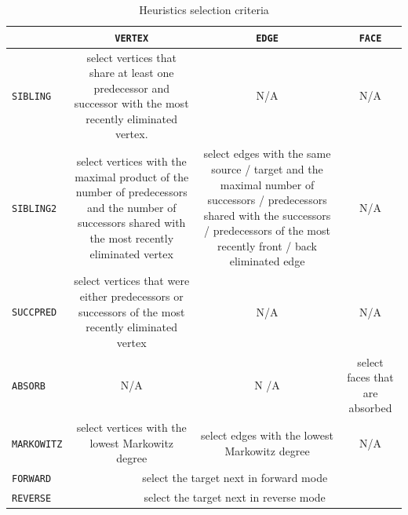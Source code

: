 \documentclass{book}
\begin{document}
\begin{table}[htb]
  \begin{tabular}{|l|c|c|c|}\hline
    & {\tt VERTEX} & {\tt EDGE} & {\tt FACE} 
    \\\hline %
    {\tt SIBLING} 
    &
    \begin{minipage}{.4\linewidth}
      \footnotesize
      select vertices that share at least one predecessor
      and successor with the most recently eliminated vertex.
    \end{minipage}
    & N/A & N/A
    \\\hline %
    {\tt SIBLING2} 
    &
    \begin{minipage}{.4\linewidth}
      \footnotesize
      select vertices with the maximal product of 
      the number of predecessors and the number of 
      successors shared with the most recently eliminated vertex
    \end{minipage}
    &
    \begin{minipage}{.2\linewidth}
      \footnotesize
      select edges with the same source / target and the 
      maximal number of successors / predecessors shared with the 
      successors / predecessors of 
      the most recently front / back eliminated edge
    \end{minipage}
    & N/A 
    \\\hline  %
    {\tt SUCCPRED} 
    &
    \begin{minipage}{.4\linewidth}
      \footnotesize
      select vertices  that were either predecessors or successors of
      the most recently eliminated vertex
    \end{minipage}
    & N/A & N/A 
    \\\hline %
    {\tt ABSORB} 
    & N/A & N /A &
    \begin{minipage}{.2\linewidth}
      select faces that are absorbed
    \end{minipage}
    \\\hline %
    {\tt MARKOWITZ} 
    &
    \begin{minipage}{.4\linewidth}
      \footnotesize
      select vertices with  the lowest Markowitz degree
    \end{minipage}
    &
    \begin{minipage}{.2\linewidth}
      \footnotesize
      select edges with the lowest Markowitz degree
    \end{minipage}
    &
    N/A
    \\\hline %
    {\tt FORWARD} 
    &\multicolumn{3}{c|}{
      select the target next in forward mode
    }
    \\\hline %
    {\tt REVERSE} 
    &\multicolumn{3}{c|}{
      select the target next in reverse mode
    }
    \\\hline %
  \end{tabular}
  \caption{Heuristics selection criteria}\label{tab:memOpsHeur}
\end{table}
\end{document}
